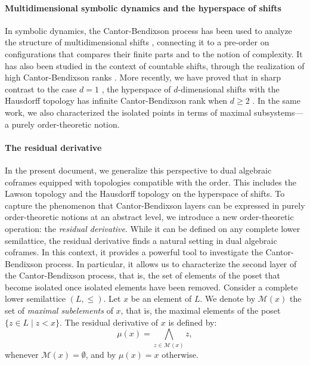 \documentclass{article}
\newcommand\rst{\bgroup\markoverwith{\textcolor{red}{\rule[0.5ex]{2pt}{0.4pt}}}\ULon}
\begin{document}
\paragraph{Multidimensional symbolic dynamics and the hyperspace of shifts} In symbolic dynamics, the Cantor-Bendixson process has been used to analyze the structure of multidimensional shifts \cite{ballier2013structuringmultidimensionalsubshifts}, connecting it to a pre-order on configurations that compares their finite parts and to the notion of complexity. It has also been studied in the context of countable shifts, through the realization of high Cantor-Bendixson ranks \cite{salo2013constructionscountablesubshiftsfinite}. More recently, we have proved that %
{in sharp contrast to the case} $d=1$ \cite{pavlov2022structuregenericsubshifts} , the hyperspace of $d$-dimensional shifts with the Hausdorff topology has infinite Cantor-Bendixson rank when $d \ge 2$ \cite{GN25}.
In the same work, we also characterized the isolated points in terms of maximal subsystems---a purely order-theoretic notion.

\paragraph{The residual derivative}
In the present document, we generalize this perspective to dual algebraic coframes equipped with topologies compatible with the order. This includes the Lawson topology and the Hausdorff topology on the hyperspace of shifts. {To capture the phenomenon that Cantor-Bendixson layers can be expressed in purely order-theoretic notions at an abstract level, we introduce a new order-theoretic operation: the \textit{residual derivative}.}
While it can be defined on any complete lower semilattice, 
{the residual derivative finds a natural setting in dual algebraic coframes. In this context, it provides a powerful}
tool to investigate the Cantor-Bendixson process. In particular, it allows us to characterize the second layer of the Cantor-Bendixson process, that is, the set of elements of the poset that become isolated once isolated elements have been removed. 
Consider a complete lower semilattice $(L,\le)$. 
Let $x$ be an element of $L$. We denote by $\mathcal{M}(x)$ the set of \textit{maximal subelements} of $x$, that is, the maximal elements %
{of the poset \(\{z\in L\mid z<x\}\)}. The residual derivative of $x$ is 
{defined by:}
\[\mu(x) = \bigwedge_{z \in \mathcal{M}(x)} z,\]
{whenever \(\mathcal{M}(x)=\emptyset\), and by \(\mu(x)=x\) otherwise.}
\end{document}

